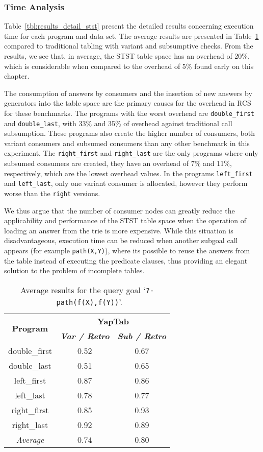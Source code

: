 \subsubsection{Time Analysis}

Table~\ref{tbl:results_detail_stst} present the detailed results concerning execution time for each
program and data set.
The average results are presented in Table~\ref{tbl:results_average_stst} compared to traditional
tabling with variant and subsumptive checks. From the results,
we see that, in average, the STST table space has an overhead of 20\%, which is considerable when
compared to the overhead of 5\% found early on this chapter.

The consumption of answers by consumers and the insertion of new answers by generators into the table
space are the primary causes for the overhead in RCS for these benchmarks. The programs with the
worst overhead are \texttt{double\_first} and \texttt{double\_last}, with 33\% and 35\% of overhead
against traditional call subsumption. These programs also create the higher number of consumers,
both variant consumers and subsumed consumers than any other benchmark in this experiment.
The \texttt{right\_first} and \texttt{right\_last} are the only programs where only subsumed
consumers are created, they have an overhead of 7\% and 11\%, respectively, which are the lowest
overhead values. In the programs \texttt{left\_first} and \texttt{left\_last}, only one variant
consumer is allocated, however they perform worse than the \texttt{right} versions.

We thus argue that the number of consumer nodes can greatly reduce the
applicability and performance of the STST table space when the operation of loading an answer
from the trie is more expensive. While this situation is disadvantageous, execution time can
be reduced when another subgoal call appears (for example \texttt{path(X,Y)}), where its possible to
reuse the answers from the table instead of executing the predicate clauses, thus providing an
elegant solution to the problem of incomplete tables.

\begin{table}[ht]
\centering
  \begin{tabular}{ccc}
   \hline
    \hline
    \multirow{2}{*}{\textbf{Program}} & \multicolumn{2}{c}{\textbf{YapTab}} \\
    & \textbf{\textit{\small{Var / Retro}}} & \textbf{\textit{\small{Sub / Retro}}} \\
   \hline
   \hline
double\_first & 0.52 & 0.67 \\
double\_last & 0.51 & 0.65 \\
left\_first & 0.87 & 0.86 \\
left\_last & 0.78 & 0.77 \\
right\_first & 0.85 & 0.93 \\
right\_last & 0.92 & 0.89 \\
\hline
\hline
\textit{Average} & 0.74 &  0.80 \\
\hline
\hline
\end{tabular}
\caption{Average results for the query goal `\texttt{?-~path(f(X),f(Y))}'.}
\label{tbl:results_average_stst}
\end{table}

